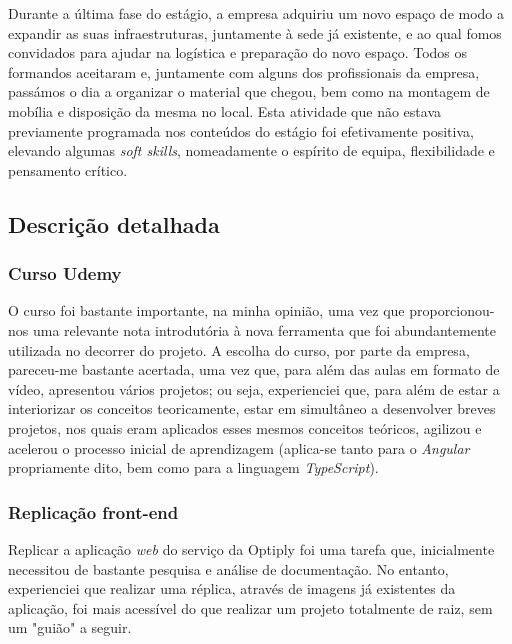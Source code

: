 \documentclass{article}
\begin{document}
\hspace*{0.5cm} Durante a última fase do estágio, a empresa adquiriu um novo espaço de modo a expandir as suas infraestruturas, juntamente à sede já existente, e ao qual fomos convidados para ajudar na logística e preparação do novo espaço. Todos os formandos aceitaram e, juntamente com alguns dos profissionais da empresa, passámos o dia a organizar o material que chegou, bem como na montagem de mobília e disposição da mesma no local. Esta atividade que não estava previamente programada nos conteúdos do estágio foi efetivamente positiva, elevando algumas \emph{soft skills}, nomeadamente o espírito de equipa, flexibilidade e pensamento crítico. \newline

\subsection{Descrição detalhada}
\subsubsection{Curso Udemy}
\hspace*{0.5cm} O curso foi bastante importante, na minha opinião, uma vez que proporcionou-nos uma relevante nota introdutória à nova ferramenta que foi abundantemente utilizada no decorrer do projeto. A escolha do curso, por parte da empresa, pareceu-me bastante acertada, uma vez que, para além das aulas em formato de vídeo, apresentou vários projetos; ou seja, experienciei que, para além de estar a interiorizar os conceitos teoricamente, estar em simultâneo a desenvolver breves projetos, nos quais eram aplicados esses mesmos conceitos teóricos, agilizou e acelerou o processo inicial de aprendizagem (aplica-se tanto para o \emph{Angular} propriamente dito, bem como para a linguagem \emph{TypeScript}).

\subsubsection{Replicação front-end}
\hspace*{0.5cm} Replicar a aplicação \emph{web} do serviço da Optiply foi uma tarefa que, inicialmente necessitou de bastante pesquisa e análise de documentação. No entanto, experienciei que realizar uma réplica, através de imagens já existentes da aplicação, foi mais acessível do que realizar um projeto totalmente de raiz, sem um "guião" a seguir. \newline
\end{document}
